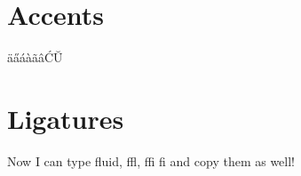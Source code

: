\documentclass[12pt]{article}
\begin{document}
\section{Accents}

\"{a}\H{a}\'{a}\`{a}\~{a}\^{a}\'{C}\u{U}

\section{Ligatures}



Now I can type fluid, ffl, ffi fi and copy them as well!
\end{document}
